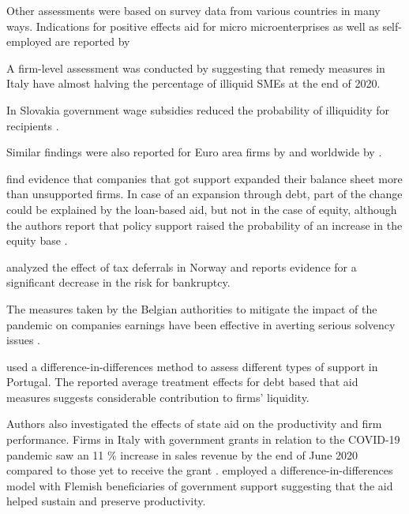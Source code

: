 Other assessments were based on survey data from various countries in many ways. Indications for positive effects aid for micro microenterprises as well as self-employed are reported by \parencite{kochaniak_effectiveness_2023,bertschek_german_2022}

A firm-level assessment was conducted by \parencite{bellucci_consequences_2022} suggesting that remedy measures in Italy have almost halving the percentage of illiquid SMEs at the end of 2020. 

In Slovakia government wage subsidies reduced the probability of illiquidity for recipients \parencite{lalinsky_distribution_2021}.

Similar findings were also reported for Euro area firms by \parencite{de_santis_impact_2021} and worldwide by \parencite{igan_shot_2023}.

\parencite{harasztosi_firm-level_2022} find evidence that companies that got support expanded their balance sheet more than unsupported firms. In case of an expansion through debt, part of the change could be explained by the loan-based aid, but not in the case of equity, although the authors report that policy support raised the probability of an increase in the equity base \parencite{harasztosi_firm-level_2022}.

\parencite{stien_covid-19_2022} analyzed the effect of tax deferrals in Norway and reports evidence for a significant decrease in the risk for bankruptcy.

The measures taken by the Belgian authorities to mitigate the impact of the pandemic on companies earnings have been effective in averting serious solvency issues \parencite{piette_how_2022}.

\parencite{costa_state-aids_2021} used a difference-in-differences method to assess different types of support in Portugal. The reported average treatment effects for debt based that aid measures suggests considerable contribution to firms’ liquidity.

Authors also investigated the effects of state aid on the productivity and firm performance. Firms in Italy with government grants in relation to the COVID-19 pandemic saw an 11 \% increase in sales revenue by the end of June 2020 compared to those yet to receive the grant \parencite{turkson_government_2021}. \parencite{konings_impact_nodate} employed a difference-in-differences model with Flemish beneficiaries of government support suggesting that the aid helped sustain and preserve productivity.




